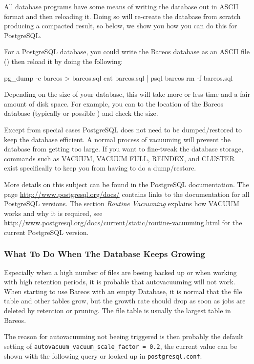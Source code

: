 All database programs have some means of writing the database out in ASCII
format and then reloading it. Doing so will re-create the database from
scratch producing a compacted result, so below, we show you how you can do
this for PostgreSQL.

For a PostgreSQL database, you could write the Bareos database as an
ASCII file () then reload it by doing the following:

\begin{commands}{}
pg_dump -c bareos > bareos.sql
cat bareos.sql | psql bareos
rm -f bareos.sql
\end{commands}

Depending on the size of your database, this will take more or less time and a
fair amount of disk space. For example, you can  to the location of
the Bareos database (typically  or possible
) and check the size.

Except from special cases PostgreSQL does not
need to be dumped/restored to keep the database efficient.  A normal
process of vacuuming will prevent the database from getting too
large.  If you want to fine-tweak the database storage, commands such
as VACUUM, VACUUM FULL, REINDEX, and CLUSTER exist specifically to keep you
from having to do a dump/restore.

More details on this subject can be found in the PostgreSQL documentation.
The page \url{http://www.postgresql.org/docs/} contains links to the documentation
for all PostgreSQL versions. The section \emph{Routine Vacuuming} explains
how VACUUM works and why it is required, see
\url{http://www.postgresql.org/docs/current/static/routine-vacuuming.html}
for the current PostgreSQL version.

\subsubsection{What To Do When The Database Keeps Growing}
\label{PostgresSize}
Especially when a high number of files are beeing backed up or when working with
high retention periods, it is probable that autovacuuming will not work.
When starting to use Bareos with an empty Database, it is normal that the file
table and other tables grow, but the growth rate should drop as soon as jobs are deleted by
retention or pruning. The file table is usually the largest table in Bareos.

The reason for autovacuuming not beeing triggered is then probably the default
setting of \texttt{autovacuum\_vacuum\_scale\_factor = 0.2}, the current value can
be shown with the following query or looked up in \texttt{postgresql.conf}:

